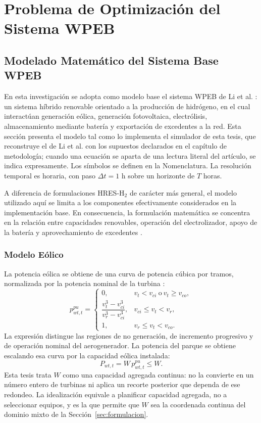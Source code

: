 \section{Problema de Optimización del Sistema WPEB}
\label{sec:wpeb}

\subsection{Modelado Matemático del Sistema Base WPEB}

En esta investigación se adopta como modelo base el sistema WPEB de Li et al. \cite{Li2024WPEB}: un sistema híbrido renovable orientado a la producción de hidrógeno, en el cual interactúan generación eólica, generación fotovoltaica, electrólisis, almacenamiento mediante batería y exportación de excedentes a la red. Esta sección presenta el modelo tal como lo implementa el simulador de esta tesis, que reconstruye el de Li et al. con los supuestos declarados en el capítulo de metodología; cuando una ecuación se aparta de una lectura literal del artículo, se indica expresamente. Los símbolos se definen en la Nomenclatura. La resolución temporal es horaria, con paso $\Delta t=1$ h sobre un horizonte de $T$ horas.

A diferencia de formulaciones HRES-H$_2$ de carácter más general, el modelo utilizado aquí se limita a los componentes efectivamente considerados en la implementación base. En consecuencia, la formulación matemática se concentra en la relación entre capacidades renovables, operación del electrolizador, apoyo de la batería y aprovechamiento de excedentes \cite{Li2024WPEB}.

\subsubsection{Modelo Eólico}

La potencia eólica se obtiene de una curva de potencia cúbica por tramos, normalizada por la potencia nominal de la turbina \cite{Li2024WPEB,Wang2021HybridSystem}:
\begin{equation}
p^{pu}_{wt,t}=
\begin{cases}
0, & v_t<v_{ci} \ \text{o} \ v_t\geq v_{co}, \\[4pt]
\dfrac{v_t^3-v_{ci}^3}{v_r^3-v_{ci}^3}, & v_{ci}\leq v_t<v_r, \\[10pt]
1, & v_r\leq v_t<v_{co}.
\end{cases}
\end{equation}
La expresión distingue las regiones de no generación, de incremento progresivo y de operación nominal del aerogenerador. La potencia del parque se obtiene escalando esa curva por la capacidad eólica instalada:
\begin{equation}
P_{wt,t}=W\,p^{pu}_{wt,t}\leq W.
\end{equation}
Esta tesis trata $W$ como una capacidad agregada continua: no la convierte en un número entero de turbinas ni aplica un recorte posterior que dependa de ese redondeo. La idealización equivale a planificar capacidad agregada, no a seleccionar equipos, y es la que permite que $W$ sea la coordenada continua del dominio mixto de la Sección~\ref{sec:formulacion}.

